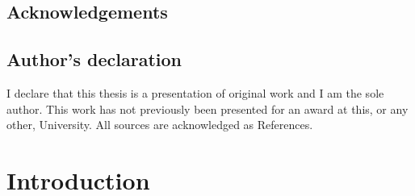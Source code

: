 \setcounter{tocdepth}{3}
\tableofcontents

\newpage

\listoffigures

\newpage

\listoftables

\newpage




\section{Acknowledgements}

\newpage

\section{Author's declaration}

\label{sec:declaration}

I declare that this thesis is a presentation of original work and I am the sole author. This work has not previously been presented for an award at this, or any other, University. All sources are acknowledged as References. 

\newpage



\setcounter{secnumdepth}{4}

\pagestyle{fancy}
\renewcommand{\headrulewidth}{0pt}
\rhead{\slshape\nouppercase{\leftmark}}
\lhead[E,O]{}


\chapter{Introduction}

